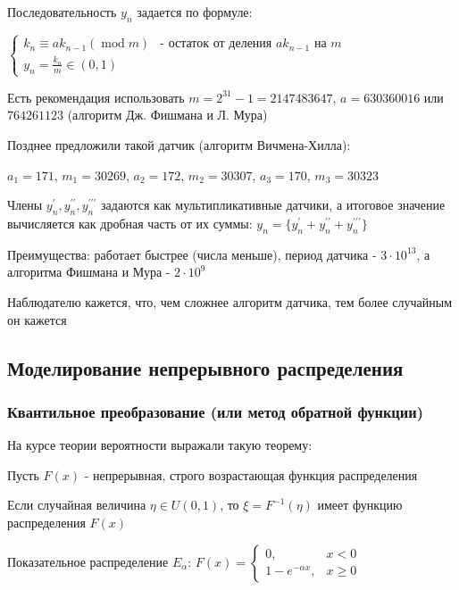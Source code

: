 \documentclass[12pt]{article}
\begin{document}
\begin{enumerate}[label*=\Roman*. ]
    Последовательность $y_n$ задается по формуле:

    $\begin{cases}
        k_n \equiv a k_{n - 1} (\operatorname{mod} m) & \text{- остаток от деления }ak_{n - 1}\text{ на }m \\
        y_n = \frac{k_n}{m} \in (0, 1)
    \end{cases}$

    Есть рекомендация использовать $m = 2^{31} - 1 = 2147483647$, $a = 630360016$ или $764261123$ (алгоритм Дж. Фишмана и Л. Мура)

    \mediumvspace

    Позднее предложили такой датчик (алгоритм Вичмена-Хилла):

    $a_1 = 171$, $m_1 = 30269$, $a_2 = 172$, $m_2 = 30307$, $a_3 = 170$, $m_3 = 30323$ 

    Члены $y_n^\prime, y_n^{\prime\prime}, y_n^{\prime\prime\prime}$ задаются как мультипликативные датчики, а итоговое значение вычисляется как дробная часть от их суммы: $y_n = \{y_n^\prime + y_n^{\prime\prime} + y_n^{\prime\prime\prime}\}$

    Преимущества: работает быстрее (числа меньше), период датчика - $3 \cdot 10^{13}$, а алгоритма Фишмана и Мура - $2 \cdot 10^9$

    Наблюдателю кажется, что, чем сложнее алгоритм датчика, тем более случайным он кажется

\end{enumerate}

\subsection{Моделирование непрерывного распределения}

\subsubsection{Квантильное преобразование (или метод обратной функции)}

На курсе теории вероятности выражали такую теорему:

\begin{MyTheorem}
    \Ths Пусть $F(x)$ - непрерывная, строго возрастающая функция распределения

    Если случайная величина $\eta \in U(0, 1)$, то $\xi = F^{-1}(\eta)$ имеет функцию распределения $F(x)$
\end{MyTheorem}

\Ex Показательное распределение $E_\alpha$: $F(x) = \begin{cases}0, & x < 0 \\ 1 - e^{-\alpha x}, & x \geq 0\end{cases}$
\end{document}
